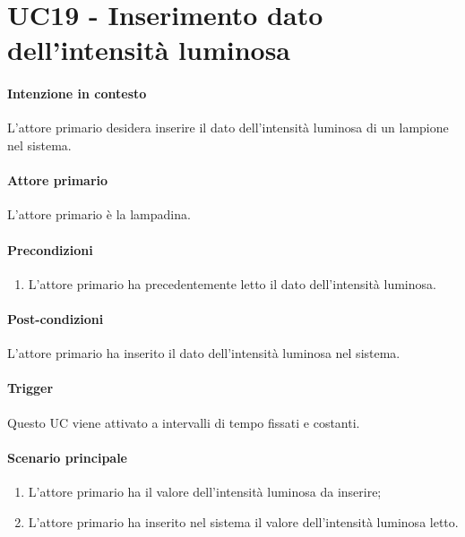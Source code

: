 \section{UC19 - Inserimento dato dell'intensità luminosa}\label{uc:19}
\paragraph{Intenzione in contesto} L'attore primario desidera inserire il dato dell'intensità luminosa di un lampione nel sistema.
\paragraph{Attore primario} L'attore primario è la lampadina.
\paragraph{Precondizioni}  
\begin{enumerate}
    \item L'attore primario ha precedentemente letto il dato dell'intensità luminosa.
\end{enumerate}
\paragraph{Post-condizioni} L'attore primario ha inserito il dato dell'intensità luminosa nel sistema.
\paragraph{Trigger} Questo UC viene attivato a intervalli di tempo fissati e costanti.
\paragraph{Scenario principale}
\begin{enumerate}
    \item L'attore primario ha il valore dell'intensità luminosa da inserire;
    \item L'attore primario ha inserito nel sistema il valore dell'intensità luminosa letto.
\end{enumerate}